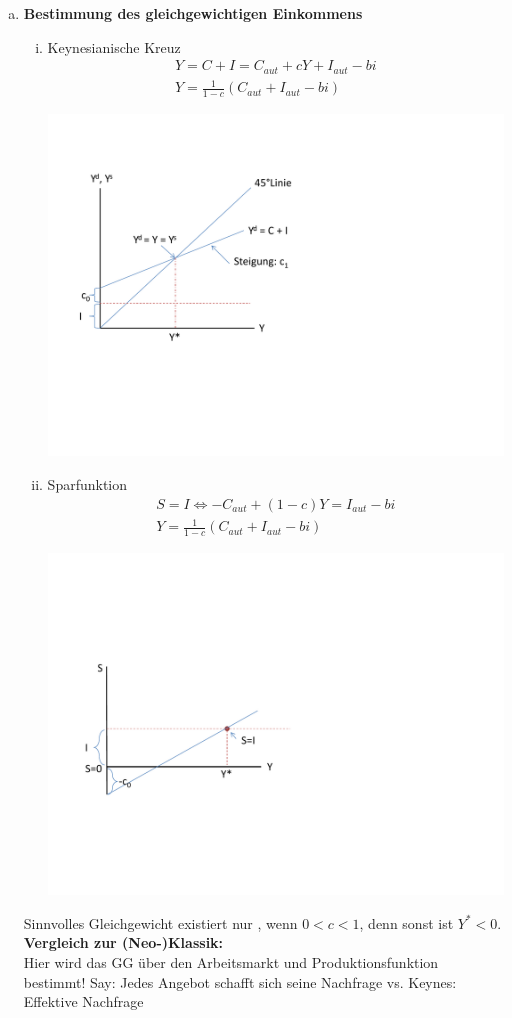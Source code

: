 \documentclass{scrartcl}
\begin{document}
\begin{enumerate}[(a)]
\item
\textbf{Bestimmung des gleichgewichtigen Einkommens}
\begin{enumerate}[(i)]
  \item Keynesianische Kreuz
  \begin{align*}
    Y=C+I=C_{aut}+c Y + I_{aut} -b i\\
    Y= \frac{1}{1-c} (C_{aut} + I_{aut} - b i)
  \end{align*}
  \begin{center}
  \includegraphics[width=.5\textwidth]{Bilder/Keynes_IS_GG1.pdf}
  \end{center}
  \item Sparfunktion
  \begin{align*}
    S=I \Leftrightarrow -C_{aut} + (1-c)Y = I_{aut} -b i\\
    Y= \frac{1}{1-c} (C_{aut} + I_{aut} - b i)
  \end{align*}
    \begin{center}
  \includegraphics[width=.5\textwidth]{Bilder/Keynes_IS_GG2.pdf}
  \end{center}
\end{enumerate}
Sinnvolles Gleichgewicht existiert nur , wenn $0<c<1$, denn sonst ist $Y^* <0$.\\
\textbf{Vergleich zur (Neo-)Klassik:}\\Hier wird das GG \"{u}ber den Arbeitsmarkt und Produktionsfunktion bestimmt! Say: Jedes Angebot schafft sich seine Nachfrage vs. Keynes: Effektive Nachfrage


\end{enumerate}
\end{document}
